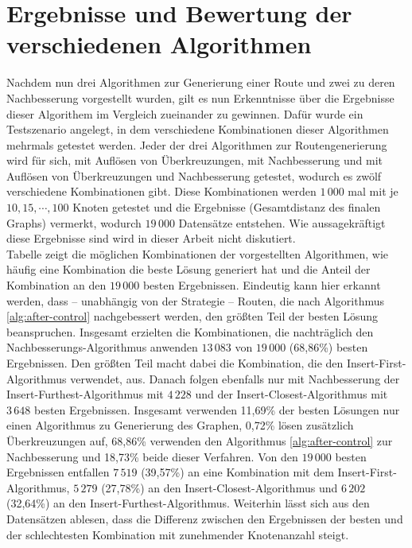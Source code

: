 \chapter{Ergebnisse und Bewertung der verschiedenen Algorithmen}\label{sec:result}
Nachdem nun drei Algorithmen zur Generierung einer Route und zwei zu deren Nachbesserung vorgestellt wurden, gilt es nun Erkenntnisse über die Ergebnisse dieser Algorithem im Vergleich zueinander zu gewinnen.
Dafür wurde ein Testszenario angelegt, in dem verschiedene Kombinationen dieser Algorithmen mehrmals getestet werden.
Jeder der drei Algorithmen zur Routengenerierung wird für sich, mit Auflösen von Überkreuzungen, mit Nachbesserung und mit Auflösen von Überkreuzungen und Nachbesserung getestet, wodurch es zwölf verschiedene Kombinationen gibt.
Diese Kombinationen werden $1\,000$ mal mit je $10,15,\cdots,100$ Knoten getestet und die Ergebnisse (Gesamtdistanz des finalen Graphs) vermerkt, wodurch $19\,000$ Datensätze entstehen. 
Wie aussagekräftigt diese Ergebnisse sind wird in dieser Arbeit nicht diskutiert.
\\
Tabelle %
zeigt die möglichen Kombinationen der vorgestellten Algorithmen, wie häufig eine Kombination die beste Lösung generiert hat und die Anteil der Kombination an den $19\,000$ besten Ergebnissen.
Eindeutig kann hier erkannt werden, dass -- unabhängig von der Strategie -- Routen, die nach Algorithmus \vref{alg:after-control} nachgebessert werden, den größten Teil der besten Lösung beanspruchen.
Insgesamt erzielten die Kombinationen, die nachträglich den Nachbesserungs-Algorithmus anwenden $13\,083$ von $19\,000$ (68,86\%) besten Ergebnissen.
Den größten Teil macht dabei die Kombination, die den Insert-First-Algorithmus verwendet, aus.
Danach folgen ebenfalls nur mit Nachbesserung der Insert-Furthest-Algorithmus mit $4\,228$ und der Insert-Closest-Algorithmus mit $3\,648$ besten Ergebnissen.
Insgesamt verwenden 11,69\% der besten Lösungen nur einen Algorithmus zu Generierung des Graphen, 0,72\% lösen zusätzlich Überkreuzungen auf, 68,86\% verwenden den Algorithmus \vref{alg:after-control} zur Nachbesserung und 18,73\% beide dieser Verfahren.
Von den $19\,000$ besten Ergebnissen entfallen $7\,519$ (39,57\%) an eine Kombination mit dem Insert-First-Algorithmus, $5\,279$ (27,78\%) an den Insert-Closest-Algorithmus und $6\,202$ (32,64\%) an den Insert-Furthest-Algorithmus.
Weiterhin lässt sich aus den Datensätzen ablesen, dass die Differenz zwischen den Ergebnissen der besten und der schlechtesten Kombination mit zunehmender Knotenanzahl steigt.
